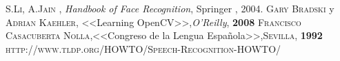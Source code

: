 \documentclass[a4paper,11pt]{article}
\begin{document}
\begin{thebibliography}{X}
	 \textsc{S.Li, A.Jain} ,
	\textit{Handbook of Face Recognition}, Springer , 2004.
	 \textsc{Gary Bradski } y \textsc{ Adrian Kaehler},
	<<Learning OpenCV>>,\textit{O'Reilly}, \textbf{2008}
	 \textsc{Francisco Casacuberta Nolla},<<Congreso de la Lengua Española>>,\textsc{Sevilla}, \textbf{1992}
	 \textsc{ http://www.tldp.org/HOWTO/Speech-Recognition-HOWTO/}
	
\end{thebibliography}
\end{document}
